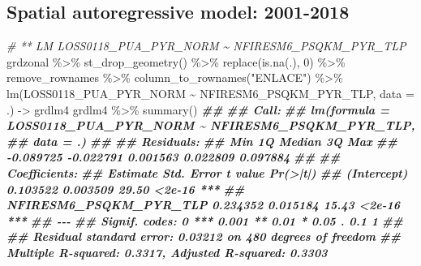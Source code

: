 \documentclass[10pt,landscape,a3paper]{article}
\newenvironment{Shaded}{\begin{snugshade}}{\end{snugshade}}
\newcommand{\AttributeTok}[1]{\textcolor[rgb]{0.77,0.63,0.00}{#1}}
\newcommand{\CommentTok}[1]{\textcolor[rgb]{0.56,0.35,0.01}{\textit{#1}}}
\newcommand{\DecValTok}[1]{\textcolor[rgb]{0.00,0.00,0.81}{#1}}
\newcommand{\DocumentationTok}[1]{\textcolor[rgb]{0.56,0.35,0.01}{\textbf{\textit{#1}}}}
\newcommand{\FunctionTok}[1]{\textcolor[rgb]{0.00,0.00,0.00}{#1}}
\newcommand{\NormalTok}[1]{#1}
\newcommand{\OtherTok}[1]{\textcolor[rgb]{0.56,0.35,0.01}{#1}}
\newcommand{\SpecialCharTok}[1]{\textcolor[rgb]{0.00,0.00,0.00}{#1}}
\newcommand{\StringTok}[1]{\textcolor[rgb]{0.31,0.60,0.02}{#1}}
\begin{document}
\hypertarget{spatial-autoregressive-model-2001-2018}{%
\subsection{Spatial autoregressive model:
2001-2018}\label{spatial-autoregressive-model-2001-2018}}

\begin{Shaded}
\begin{Highlighting}[]
\CommentTok{\# ** LM LOSS0118\_PUA\_PYR\_NORM \textasciitilde{} NFIRESM6\_PSQKM\_PYR\_TLP}
\NormalTok{grdzonal }\SpecialCharTok{\%\textgreater{}\%}
    \FunctionTok{st\_drop\_geometry}\NormalTok{() }\SpecialCharTok{\%\textgreater{}\%}
    \FunctionTok{replace}\NormalTok{(}\FunctionTok{is.na}\NormalTok{(.), }\DecValTok{0}\NormalTok{) }\SpecialCharTok{\%\textgreater{}\%}
\NormalTok{    remove\_rownames }\SpecialCharTok{\%\textgreater{}\%}
    \FunctionTok{column\_to\_rownames}\NormalTok{(}\StringTok{"ENLACE"}\NormalTok{) }\SpecialCharTok{\%\textgreater{}\%}
    \FunctionTok{lm}\NormalTok{(LOSS0118\_PUA\_PYR\_NORM }\SpecialCharTok{\textasciitilde{}}\NormalTok{ NFIRESM6\_PSQKM\_PYR\_TLP, }\AttributeTok{data =}\NormalTok{ .) }\OtherTok{{-}\textgreater{}}\NormalTok{ grdlm4}
\NormalTok{grdlm4 }\SpecialCharTok{\%\textgreater{}\%}
    \FunctionTok{summary}\NormalTok{()}
\DocumentationTok{\#\# }
\DocumentationTok{\#\# Call:}
\DocumentationTok{\#\# lm(formula = LOSS0118\_PUA\_PYR\_NORM \textasciitilde{} NFIRESM6\_PSQKM\_PYR\_TLP, }
\DocumentationTok{\#\#     data = .)}
\DocumentationTok{\#\# }
\DocumentationTok{\#\# Residuals:}
\DocumentationTok{\#\#       Min        1Q    Median        3Q       Max }
\DocumentationTok{\#\# {-}0.089725 {-}0.022791  0.001563  0.022809  0.097884 }
\DocumentationTok{\#\# }
\DocumentationTok{\#\# Coefficients:}
\DocumentationTok{\#\#                        Estimate Std. Error t value Pr(\textgreater{}|t|)    }
\DocumentationTok{\#\# (Intercept)            0.103522   0.003509   29.50   \textless{}2e{-}16 ***}
\DocumentationTok{\#\# NFIRESM6\_PSQKM\_PYR\_TLP 0.234352   0.015184   15.43   \textless{}2e{-}16 ***}
\DocumentationTok{\#\# {-}{-}{-}}
\DocumentationTok{\#\# Signif. codes:  0 \textquotesingle{}***\textquotesingle{} 0.001 \textquotesingle{}**\textquotesingle{} 0.01 \textquotesingle{}*\textquotesingle{} 0.05 \textquotesingle{}.\textquotesingle{} 0.1 \textquotesingle{} \textquotesingle{} 1}
\DocumentationTok{\#\# }
\DocumentationTok{\#\# Residual standard error: 0.03212 on 480 degrees of freedom}
\DocumentationTok{\#\# Multiple R{-}squared:  0.3317, Adjusted R{-}squared:  0.3303 }

\end{Highlighting}
\end{Shaded}
\end{document}
